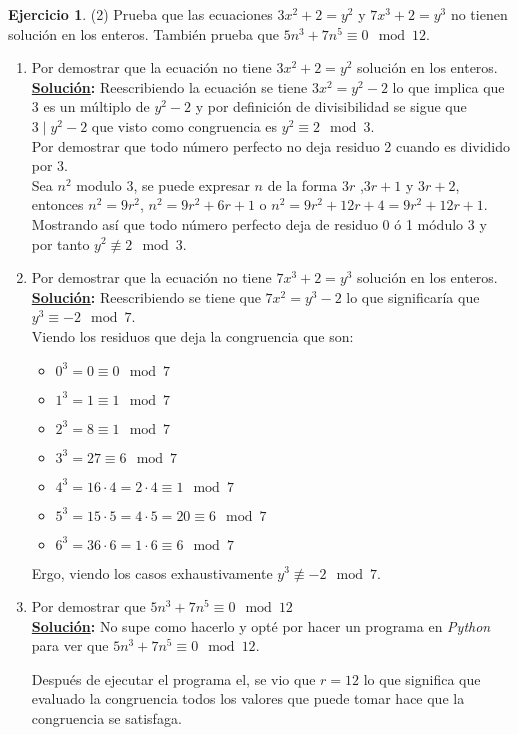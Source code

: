 \documentclass[11pt,letterpaper]{article}
\theoremstyle{definition}\newtheorem{p}{Ejercicio}
\newcommand{\sol}{\textbf{\underline{Solución}: }} %
\begin{document}
\begin{p}(2)
Prueba que las ecuaciones $3x^2+2=y^2$ y $7x^3+2=y^3$ no tienen soluci\'on en los enteros.
Tambi\'en prueba que $5n^3+7n^5 \equiv 0\mod 12$.
\begin{enumerate}
    \item Por demostrar que la ecuación no tiene $3x^2+2=y^2$ solución en los enteros.\\
    \sol Reescribiendo la ecuación se tiene $3x^2 = y^2 -2$ lo que implica que 3 es un múltiplo de
    $y^2 -2$ y por definición de divisibilidad se sigue que $3 \mid y^2 - 2$ que visto como
    congruencia es $y^2 \equiv 2 \mod{3}$.\\
    Por demostrar que todo número perfecto no deja residuo 2 cuando es dividido por 3.\\
    Sea $n^2$ modulo 3, se puede expresar $n$ de la forma $3r$ ,$3r+1$ y $3r+2$, entonces 
    $n^2 = 9r^2$, $n^2 = 9r^2 + 6r + 1$ o $n^2  = 9r^2 + 12r + 4 = 9r^2 + 12r + 1$. Mostrando así
    que todo número perfecto deja de residuo 0 ó 1 módulo 3 y por tanto $y^2 \not\equiv 2 \mod{3}$.

    \item Por demostrar que la ecuación no tiene $7x^3+2=y^3$ solución en los enteros.\\
    \sol Reescribiendo se tiene que $7x^2 = y^3 -2$ lo que significaría que $y^3 \equiv -2 \mod{7}$.\\
    Viendo los residuos que deja la congruencia que son:
    \begin{itemize}
        \item $0^3 = 0 \equiv 0 \mod{7}$
        \item $1^3 = 1 \equiv 1 \mod{7}$
        \item $2^3 = 8 \equiv 1 \mod{7}$
        \item $3^3 = 27 \equiv 6 \mod{7}$
        \item $4^3 = 16 \cdot 4 = 2 \cdot 4 \equiv 1 \mod{7}$
        \item $5^3 = 15 \cdot 5 = 4 \cdot 5 = 20 \equiv 6 \mod{7}$
        \item $6^3 = 36 \cdot 6 = 1 \cdot 6 \equiv 6 \mod{7}$
    \end{itemize}
    Ergo, viendo los casos exhaustivamente $y^3 \not\equiv -2 \mod{7}$.

    \item Por demostrar que $5n^3+7n^5 \equiv 0 \mod{12}$\\
    \sol No supe como hacerlo y opté por hacer un programa en \textit{Python} para ver que
    $5n^3+7n^5 \equiv 0 \mod{12}$.
    
    Después de ejecutar el programa el, se vio que $r=12$ lo que significa que evaluado la congruencia
    todos los valores que puede tomar hace que la congruencia se satisfaga.
\end{enumerate}

\end{p}
\end{document}
